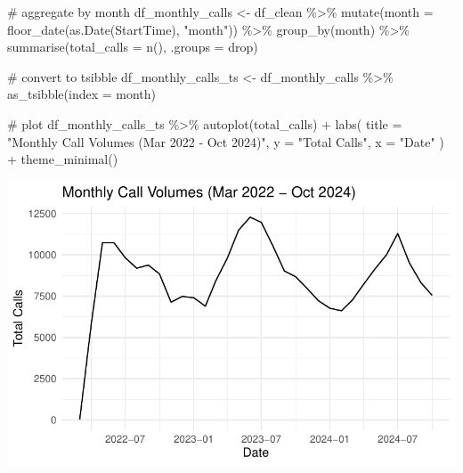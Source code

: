 \documentclass[
  letterpaper,
  DIV=11,
  numbers=noendperiod]{scrartcl}
\newenvironment{Shaded}{\begin{snugshade}}{\end{snugshade}}
\newcommand{\AttributeTok}[1]{\textcolor[rgb]{0.40,0.45,0.13}{#1}}
\newcommand{\CommentTok}[1]{\textcolor[rgb]{0.37,0.37,0.37}{#1}}
\newcommand{\FunctionTok}[1]{\textcolor[rgb]{0.28,0.35,0.67}{#1}}
\newcommand{\NormalTok}[1]{\textcolor[rgb]{0.00,0.23,0.31}{#1}}
\newcommand{\OtherTok}[1]{\textcolor[rgb]{0.00,0.23,0.31}{#1}}
\newcommand{\SpecialCharTok}[1]{\textcolor[rgb]{0.37,0.37,0.37}{#1}}
\newcommand{\StringTok}[1]{\textcolor[rgb]{0.13,0.47,0.30}{#1}}
\begin{document}
\begin{Shaded}
\begin{Highlighting}[]
\CommentTok{\# aggregate by month}
\NormalTok{df\_monthly\_calls }\OtherTok{\textless{}{-}}\NormalTok{ df\_clean }\SpecialCharTok{\%\textgreater{}\%}
  \FunctionTok{mutate}\NormalTok{(}\AttributeTok{month =} \FunctionTok{floor\_date}\NormalTok{(}\FunctionTok{as.Date}\NormalTok{(StartTime), }\StringTok{"month"}\NormalTok{)) }\SpecialCharTok{\%\textgreater{}\%}
  \FunctionTok{group\_by}\NormalTok{(month) }\SpecialCharTok{\%\textgreater{}\%}
  \FunctionTok{summarise}\NormalTok{(}\AttributeTok{total\_calls =} \FunctionTok{n}\NormalTok{(), }\AttributeTok{.groups =} \StringTok{\textquotesingle{}drop\textquotesingle{}}\NormalTok{)}

\CommentTok{\# convert to tsibble}
\NormalTok{df\_monthly\_calls\_ts }\OtherTok{\textless{}{-}}\NormalTok{ df\_monthly\_calls }\SpecialCharTok{\%\textgreater{}\%}
  \FunctionTok{as\_tsibble}\NormalTok{(}\AttributeTok{index =}\NormalTok{ month)}

\CommentTok{\# plot}
\NormalTok{df\_monthly\_calls\_ts }\SpecialCharTok{\%\textgreater{}\%}
  \FunctionTok{autoplot}\NormalTok{(total\_calls) }\SpecialCharTok{+}
  \FunctionTok{labs}\NormalTok{(}
    \AttributeTok{title =} \StringTok{"Monthly Call Volumes (Mar 2022 {-} Oct 2024)"}\NormalTok{, }
    \AttributeTok{y =} \StringTok{"Total Calls"}\NormalTok{, }
    \AttributeTok{x =} \StringTok{"Date"}
\NormalTok{  ) }\SpecialCharTok{+} 
  \FunctionTok{theme\_minimal}\NormalTok{() }
\end{Highlighting}
\end{Shaded}

\includegraphics{final_proj_group1_files/figure-pdf/aggregate_monthly_stl-1.pdf}
\end{document}
